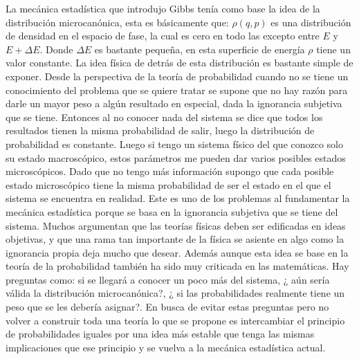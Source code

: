 La mecánica estadística que introdujo Gibbs tenía como base la idea de la distribución microcanónica, esta es básicamente que: $\rho(q,p)$ es una distribución de densidad en el espacio de fase, la cual es cero en todo las excepto entre $E$ y $E+ \Delta E$. Donde $\Delta E$ es bastante pequeña, en esta superficie de energía $\rho$ tiene un valor constante. La idea física de detrás de esta distribución es bastante simple de exponer. Desde la perspectiva de la teoría de probabilidad cuando no se tiene un conocimiento del problema que se quiere tratar se supone que no hay razón para darle un mayor peso a algún resultado en especial, dada la ignorancia subjetiva que se tiene. Entonces al no conocer nada del sistema se dice que todos los resultados tienen la misma probabilidad de salir, luego la distribución de probabilidad es constante. Luego si tengo un sistema físico del que conozco solo su estado macroscópico, estos parámetros me pueden dar varios posibles estados microscópicos. Dado que no tengo más información supongo que cada posible estado microscópico tiene la misma probabilidad de ser el estado en el que el sistema se encuentra en realidad. Este es uno de los problemas al fundamentar la mecánica estadística porque se basa en la ignorancia subjetiva que se tiene del sistema. Muchos argumentan que las teorías físicas deben ser edificadas en ideas objetivas, y que una rama tan importante de la física se asiente en algo como la ignorancia propia deja mucho que desear. Además aunque esta idea se base en la teoría de la probabilidad también ha sido muy criticada en las matemáticas. Hay preguntas como: si se llegará a conocer un poco más del sistema, ¿ aún sería válida la distribución microcanónica?, ¿ si las probabilidades realmente tiene un peso que se les debería asignar?. En busca de evitar estas preguntas pero no volver a construir toda una teoría lo que se propone es intercambiar el principio de probabilidades iguales por una idea más estable que tenga las mismas implicaciones que ese principio y se vuelva a la mecánica estadística actual.
\\
